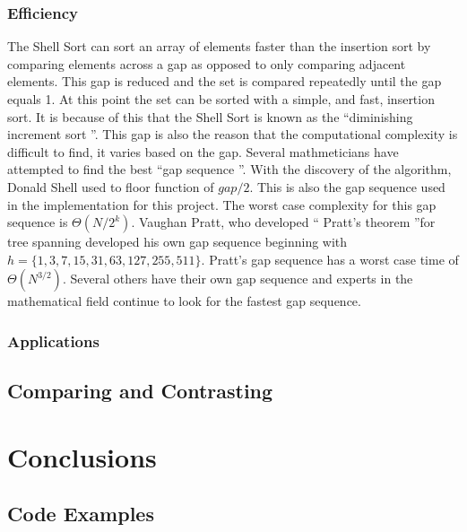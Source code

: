 \documentclass{article}
\begin{document}
    \subsubsection{Efficiency}
        The Shell Sort can sort an array of elements faster than the insertion
        sort by comparing elements across a gap as opposed to only comparing
        adjacent elements. This gap is reduced and the set is compared
        repeatedly until the gap equals 1. At this point the set can be sorted
        with a simple, and fast, insertion sort. It is because of this that the
        Shell Sort is known as the \textquotedblleft diminishing increment sort
        \textquotedblright \cite{education}. This gap is also the reason that
        the computational complexity is difficult to find, it varies based on
        the gap. Several mathmeticians have attempted to find the best
        \textquotedblleft gap sequence \textquotedblright. With the discovery
        of the algorithm, Donald Shell used to floor function of $gap / 2$.
        This is also the gap sequence used in the implementation for this
        project. The worst case complexity for this gap sequence is
        $\Theta (N/2^k)$. Vaughan Pratt, who developed \textquotedblleft
        Pratt's theorem \textquotedblright for tree spanning developed his own
        gap sequence beginning with $h= \{ 1, 3, 7, 15, 31, 63, 127, 255, 511
        \}$. Pratt's gap sequence has a worst case time of $\Theta (N^{3/2})$.
        Several others have their own gap sequence and experts in the
        mathematical field continue to look for the fastest gap
        sequence\cite{princton}.\\
    \subsubsection{Applications}
        
        
        
   \subsection{Comparing and Contrasting}
\section{Conclusions}

\begin{appendices}
\section{Code Examples}



\end{appendices}



\end{document}
